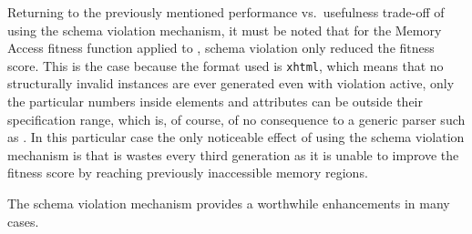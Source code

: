 Returning to the previously mentioned performance vs.\ usefulness trade-off of using the schema violation
mechanism, it must be noted that for the Memory Access fitness function applied to \libxml, schema
violation only reduced the fitness score. This is the case because the format used is \texttt{xhtml}, which
means that no structurally invalid instances are ever generated even with violation active, only the
particular numbers inside \xml elements and attributes can be outside their specification range, which is, of
course, of no consequence to a generic \xml parser such as \libxml. In this particular case the only
noticeable effect of using the schema violation mechanism is that is wastes every third generation as it is
unable to improve the fitness score by reaching previously inaccessible memory regions.

\begin{mdframed}
The schema violation mechanism provides a worthwhile enhancements in many cases.
\end{mdframed}



